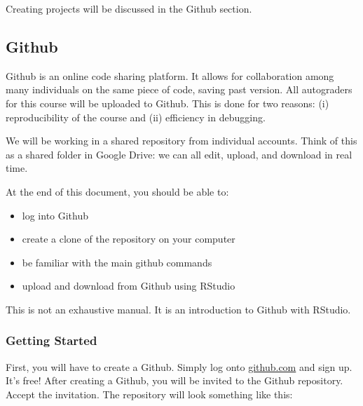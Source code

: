 \documentclass[
]{article}
\begin{document}
\begin{center}
\end{center}

Creating projects will be discussed in the Github section.

\hypertarget{github}{%
\subsection{Github}\label{github}}

Github is an online code sharing platform. It allows for collaboration
among many individuals on the same piece of code, saving past version.
All autograders for this course will be uploaded to Github. This is done
for two reasons: (i) reproducibility of the course and (ii) efficiency
in debugging.

We will be working in a shared repository from individual accounts.
Think of this as a shared folder in Google Drive: we can all edit,
upload, and download in real time.

At the end of this document, you should be able to:

\begin{itemize}
\item
  log into Github
\item
  create a clone of the repository on your computer
\item
  be familiar with the main github commands
\item
  upload and download from Github using RStudio
\end{itemize}

This is not an exhaustive manual. It is an introduction to Github with
RStudio.

\hypertarget{getting-started}{%
\subsubsection{Getting Started}\label{getting-started}}

First, you will have to create a Github. Simply log onto
\href{https://github.com/}{github.com} and sign up. It's free! After
creating a Github, you will be invited to the Github repository. Accept
the invitation. The repository will look something like this:
\end{document}
